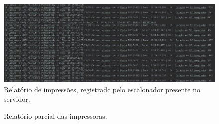 \documentclass[12pt]{article}
\begin{document}
 \begin{figure}[h]
 	\centering
  	\includegraphics[width=1\linewidth]{screenshot009.png}
 	\caption{Relatório de impressões, registrado pelo escalonador presente no servidor.}
 	\label{fig:screenshot009}
 \end{figure}






\begin{figure}[H]
	
	\center
	\qquad
	\caption{Relatório parcial das impressoras.}
	\label{figures:impre}
\end{figure}
\end{document}
